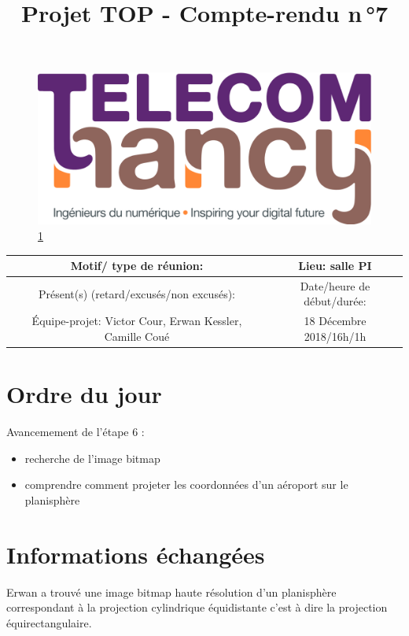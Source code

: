 \documentclass{article}
\date{}
\begin{document}
\begin{figure}
    \centering
    \includegraphics[scale=0.05]{logo_TNCY.png}
    \label{fig:logo_tncy}
    \ref{fig:logo_tncy}
\end{figure}
\title{Projet TOP - Compte-rendu n\,°7}
\maketitle
\vspace*{-1cm}

\begin{tabular}{|c|c|}
  \hline
  Motif/ type de réunion: & Lieu: salle PI \\
  \hline
   Présent(s) (retard/excusés/non excusés): &  Date/heure de début/durée:\\
  Équipe-projet: Victor Cour,
                  Erwan Kessler,
                  Camille Coué
 & 18 Décembre 2018/16h/1h\\
  \hline
\end{tabular}


\section{Ordre du jour}

Avancemement de l'étape 6 :
\begin{itemize}
  \item recherche de l'image bitmap
  \item comprendre comment projeter les coordonnées d'un aéroport sur le planisphère
\end{itemize}

\section{Informations échangées}
Erwan a trouvé une image bitmap haute résolution d’un planisphère correspondant à la projection cylindrique équidistante c'est à dire la projection équirectangulaire.
\end{document}
